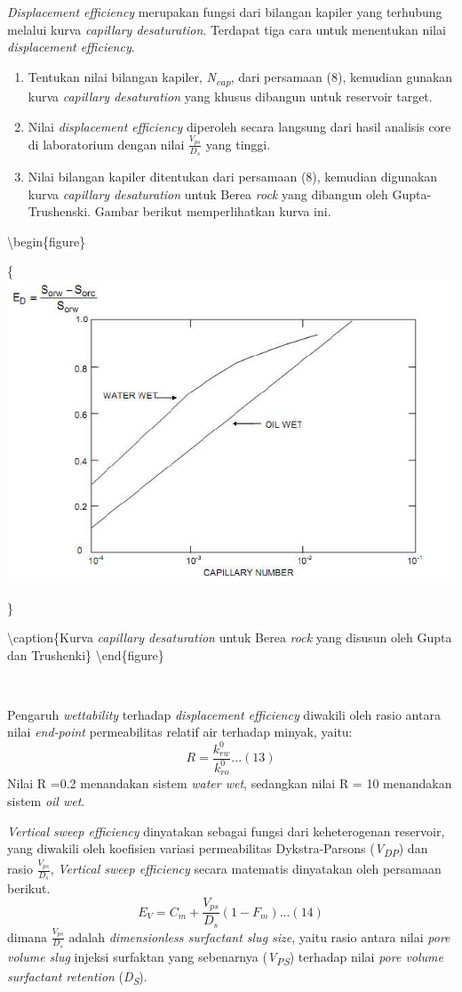 \documentclass[
]{book}
\providecommand{\tightlist}{%
  \setlength{\itemsep}{0pt}\setlength{\parskip}{0pt}}
\begin{document}
\emph{Displacement efficiency} merupakan fungsi dari bilangan kapiler yang terhubung melalui kurva \emph{capillary desaturation}. Terdapat tiga cara untuk menentukan nilai \emph{displacement efficiency}.

\begin{enumerate}
\def\labelenumi{\alph{enumi}.}
\tightlist
\item
  Tentukan nilai bilangan kapiler, \emph{N\textsubscript{cap}}, dari persamaan (8), kemudian gunakan kurva \emph{capillary desaturation} yang khusus dibangun untuk reservoir target.
\item
  Nilai \emph{displacement efficiency} diperoleh secara langsung dari hasil analisis core di laboratorium dengan nilai \(\frac{V_{ps}}{D_s}\) yang tinggi.
\item
  Nilai bilangan kapiler ditentukan dari persamaan (8), kemudian digunakan kurva \emph{capillary desaturation} untuk Berea \emph{rock} yang dibangun oleh Gupta-Trushenski. Gambar berikut memperlihatkan kurva ini.
\end{enumerate}

\textbackslash begin\{figure\}

\{\centering \includegraphics[width=0.5\linewidth]{images/chemical/berea}

\}

\textbackslash caption\{Kurva \emph{capillary desaturation} untuk Berea \emph{rock} yang disusun oleh Gupta dan Trushenki\}\label{fig:unnamed-chunk-56}
\textbackslash end\{figure\}

~

Pengaruh \emph{wettability} terhadap \emph{displacement efficiency} diwakili oleh rasio antara nilai \emph{end-point} permeabilitas relatif air terhadap minyak, yaitu:
\[R = \frac{k_{rw}^0}{k_{ro}^0}...(13)\]
Nilai R =0.2 menandakan sistem \emph{water wet}, sedangkan nilai R = 10 menandakan sistem \emph{oil wet}.

\emph{Vertical sweep efficiency} dinyatakan sebagai fungsi dari keheterogenan reservoir, yang diwakili oleh koefisien variasi permeabilitas Dykstra-Parsons (\emph{V\textsubscript{DP}}) dan rasio \(\frac{V_{ps}}{D_s}\), \emph{Vertical sweep efficiency} secara matematis dinyatakan oleh persamaan berikut.
\[E_V = C_m + \frac{V_{ps}}{D_s}(1-F_m)...(14)\]
dimana \(\frac{V_{ps}}{D_s}\) adalah \emph{dimensionless surfactant slug size}, yaitu rasio antara nilai \emph{pore volume slug} injeksi surfaktan yang sebenarnya (\emph{V\textsubscript{PS}}) terhadap nilai \emph{pore volume surfactant retention} (\emph{D\textsubscript{S}}).
\end{document}
